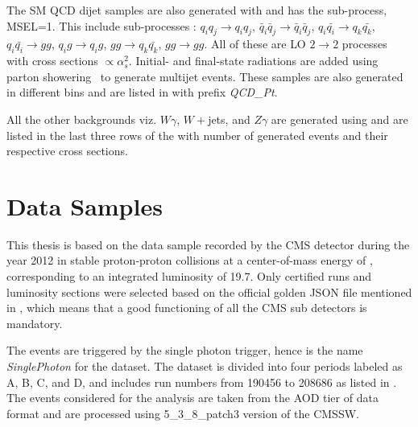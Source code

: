 The SM QCD dijet samples are also generated with  and has the sub-process, MSEL=1. This include sub-processes : 
$q_{i}q_{j}\rightarrow{q_{i}q_{j}}$, $\bar{q}_{i}\bar{q}_{j}\rightarrow{\bar{q}_{i}\bar{q}_{j}}$, $q_{i}\bar{q_{i}}\rightarrow{q_{k}\bar{q_{k}}}$, 
$q_{i}\bar{q_{i}}\rightarrow{gg}$, $q_{i}g\rightarrow{q_{i}g}$, $gg\rightarrow{q_{k}\bar{q_{k}}}$, $gg\rightarrow{gg}$.
All of these are \gls{LO} $2\rightarrow{2}$ processes with cross sections $\propto\alpha_{s}^{2}$. Initial- and final-state radiations are added 
using parton showering~\cite{Sjostrand:2006za} to generate multijet events. These samples are also generated in different
\pt bins and are listed in \tab{\ref{Table:BkgSamples}} with prefix \emph{QCD\_Pt}. 

All the other backgrounds viz. $W\gamma$, $W+$jets, and $Z\gamma$ are generated using \madgraph and are listed in the last three rows of the 
\tab{\ref{Table:BkgSamples}} with number of generated events and their respective cross sections. 

\section{Data Samples}
This thesis is based on the data sample recorded by the CMS detector during the year 2012 in stable proton-proton collisions at a
center-of-mass energy of \sqrteighttev, corresponding to an integrated luminosity of 19.7\fbinv. Only certified runs and luminosity
sections were selected based on the official golden JSON file mentioned in \tab{\ref{tab:datasets}}, which means that a good 
functioning of all the CMS sub detectors is mandatory. 

The events are triggered by the single photon trigger, hence is the name \emph{SinglePhoton} for the dataset. The dataset is divided into 
four periods labeled as A, B, C, and D, and includes run numbers from 190456 to 208686 as listed in \tab{\ref{tab:datasets}}. The events
 considered for the analysis are taken from the AOD tier of data format and are processed using 5\_3\_8\_patch3 version of the CMSSW.
